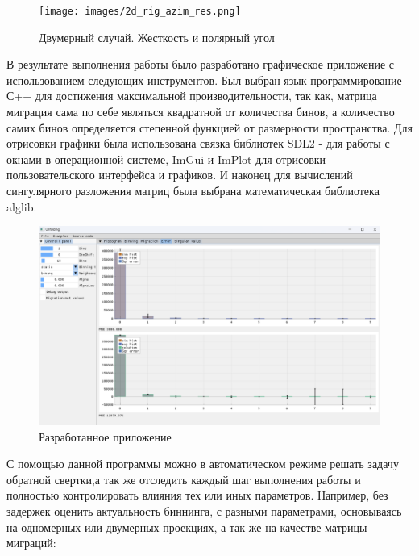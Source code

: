 \documentclass[a4paper,12pt]{diplom}
\begin{document}
\begin{figure}[h!]
   \centering
   \texttt{[image: images/2d\_rig\_azim\_res.png]}
   \caption{Двумерный случай. Жесткость и полярный угол}
\end{figure}



В результате выполнения работы было разработано графическое приложение с использованием следующих инструментов. Был выбран язык программирование С++ для 
достижения максимальной производительности, так как, матрица миграция сама по себе являться квадратной от количества бинов, а количество самих 
бинов определяется степенной функцией от размерности пространства. Для отрисовки графики была использована связка библиотек SDL2 - для работы с 
окнами в операционной системе, ImGui и ImPlot для отрисовки пользовательского интерфейса и графиков. И наконец для вычислений сингулярного 
разложения матриц была выбрана математическая библиотека alglib.

\begin{figure}[h!]
   \centering
   \includegraphics[width=\linewidth]{images/app_example.png}
   \caption{Разработанное приложение}
\end{figure}


С помощью данной программы можно в автоматическом режиме решать задачу обратной свертки,а так же отследить каждый шаг выполнения работы и полностью 
контролировать влияния тех или иных параметров. Например, без задержек оценить актуальность биннинга, с разными параметрами, основываясь 
на одномерных или двумерных проекциях, а так же на качестве матрицы миграций: 

\clearpage
\end{document}
